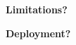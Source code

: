 \documentclass[aspectratio=169,11pt]{beamer}
\begin{document}




\begin{frame}

\centering
\vfill

{\fontsize{40}{46}\selectfont
 \color{projectblue}
 \bfseries
 Limitations?
}

\vfill

\end{frame}



\begin{frame}

\centering
\vfill

{\fontsize{36}{43}\selectfont
 \color{projectblue}
 \bfseries
Deployment?
}

\vfill

\end{frame}
\end{document}
